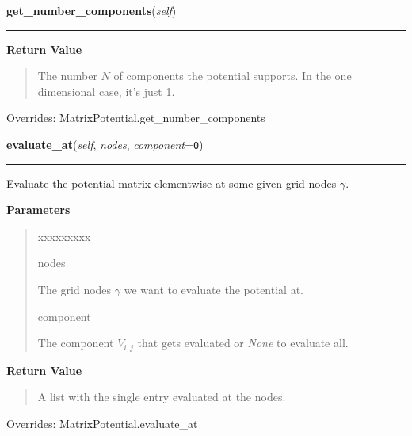 \hspace{.8\funcindent}\begin{boxedminipage}{\funcwidth}

    \raggedright \textbf{get\_number\_components}(\textit{self})

    \vspace{-1.5ex}

    \rule{\textwidth}{0.5\fboxrule}
\setlength{\parskip}{2ex}
\setlength{\parskip}{1ex}
      \textbf{Return Value}
    \vspace{-1ex}

      \begin{quote}
      The number $N$ of components the potential supports. In the one
      dimensional case, it's just 1.

      \end{quote}

      Overrides: MatrixPotential.get\_number\_components

    \end{boxedminipage}

    \vspace{0.5ex}

\hspace{.8\funcindent}\begin{boxedminipage}{\funcwidth}

    \raggedright \textbf{evaluate\_at}(\textit{self}, \textit{nodes}, \textit{component}={\tt 0})

    \vspace{-1.5ex}

    \rule{\textwidth}{0.5\fboxrule}
\setlength{\parskip}{2ex}
    Evaluate the potential matrix elementwise at some given grid nodes
    $\gamma$.

\setlength{\parskip}{1ex}
      \textbf{Parameters}
      \vspace{-1ex}

      \begin{quote}
        \begin{Ventry}{xxxxxxxxx}

          \item[nodes]

          The grid nodes $\gamma$ we want to evaluate the
          potential at.

          \item[component]

          The component $V_{i,j}$ that gets evaluated or \textit{None} to
          evaluate all.

        \end{Ventry}

      \end{quote}

      \textbf{Return Value}
    \vspace{-1ex}

      \begin{quote}
      A list with the single entry evaluated at the nodes.

      \end{quote}

      Overrides: MatrixPotential.evaluate\_at

    \end{boxedminipage}

